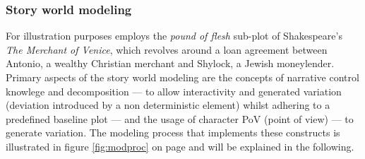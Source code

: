 \subsubsection{Story world modeling}
For illustration purposes \cite{Porteous10} employs the \emph{pound of flesh} sub-plot of Shakespeare's \emph{The Merchant of Venice}, which revolves around a loan agreement between Antonio, a wealthy Christian merchant and Shylock, a Jewish moneylender. Primary aspects of the story world modeling are the concepts of narrative control knowlege and decomposition --- to allow interactivity and generated variation (deviation introduced by a non deterministic element) whilst adhering to a predefined baseline plot --- and the usage of character PoV (point of view) --- to generate variation. The modeling process that implements these constructs is illustrated in figure \ref{fig:modproc} on page \pageref{fig:modproc} and will be explained in the following.


